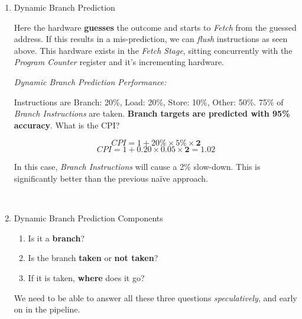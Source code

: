 \documentclass[12pt]{article}
\newenvironment{QandA}{\begin{enumerate}[label=\bfseries\arabic*.]\bfseries}
                      {\end{enumerate}}
\newenvironment{answered}{\par\quad\normalfont}{}
\begin{document}
\begin{QandA}
\begin{answered}
    \begin{equation*}
        CPI = 1 + 20\% \times 75\% \times \textbf{2}
    \end{equation*}
    \begin{equation*}
        CPI = 1 + 0.20 \times 0.75 \times \textbf{2} = 1.3
    \end{equation*}
    
    The \textbf{2} is because of the \textbf{2 cycle penalty} associated with branch mis-prediction.
    
    In this case, \textit{Branch Instructions} will cause a 30\% slow-down. We should be able to improve this if we do something a little less na\"ive than just assuming the \textit{Branch} is \textbf{not taken} each time. 
\end{answered}

\ 

\item Dynamic Branch Prediction
\begin{answered}
    Here the hardware \textbf{guesses} the outcome and starts to \textit{Fetch} from the guessed address. If this results in a mis-prediction, we can \textit{flush} instructions as seen above. This hardware exists in the \textit{Fetch Stage}, sitting concurrently with the \textit{Program Counter} register and it's incrementing hardware. 

    \textit{Dynamic Branch Prediction Performance:}

    Instructions are Branch: 20\%, Load: 20\%, Store: 10\%, Other: 50\%. 75\% of \textit{Branch Instructions} are taken. \textbf{Branch targets are predicted with 95\% accuracy}. What is the CPI?
    
    \begin{equation*}
        CPI = 1 + 20\% \times 5\% \times \textbf{2}
    \end{equation*}
    \begin{equation*}
        CPI = 1 + 0.20 \times 0.05 \times \textbf{2} = 1.02
    \end{equation*}

    In this case, \textit{Branch Instructions} will cause a 2\% slow-down. This is significantly better than the previous na\"ive approach. 
\end{answered}

\ 

\item Dynamic Branch Prediction Components
\vspace{-0.85cm}
\begin{answered}
\begin{enumerate}
    \item Is it a \textbf{branch}?
    \item Is the branch \textbf{taken} or \textbf{not taken}?
    \item If it is taken, \textbf{where} does it go?
\end{enumerate}
We need to be able to answer all these three questions \textit{speculatively}, and early on in the pipeline.


\end{answered}
\end{QandA}
\end{document}
